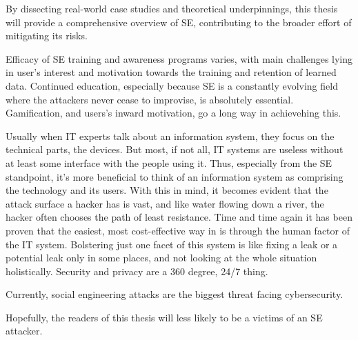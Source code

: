 By dissecting real-world case studies and theoretical underpinnings, this thesis will provide a comprehensive overview of SE, contributing to the broader effort of mitigating its risks.

Efficacy of SE training and awareness programs varies, with main challenges lying in user's interest and motivation towards the training and retention of learned data. Continued education, especially because SE is a constantly evolving field where the attackers never cease to improvise, is absolutely essential. Gamification, and users's inward motivation, go a long way in achievehing this.



Usually when IT experts talk about an information system, they focus on the technical parts, the devices. But most, if not all, IT systems are useless without at least some interface with the people using it. Thus, especially from the SE standpoint, it's more beneficial to think of an information system as comprising the technology and its users. With this in mind, it becomes evident that the attack surface a hacker has is vast, and like water flowing down a river, the hacker often chooses the path of least resistance. Time and time again it has been proven that the easiest, most cost-effective way in is through the human factor of the IT system. Bolstering just one facet of this system is like fixing a leak or a potential leak only in some places, and not looking at the whole situation holistically. Security and privacy are a 360 degree, 24/7 thing.

Currently, social engineering attacks are the biggest threat facing cybersecurity.

Hopefully, the readers of this thesis will less likely to be a victims of an SE attacker.









